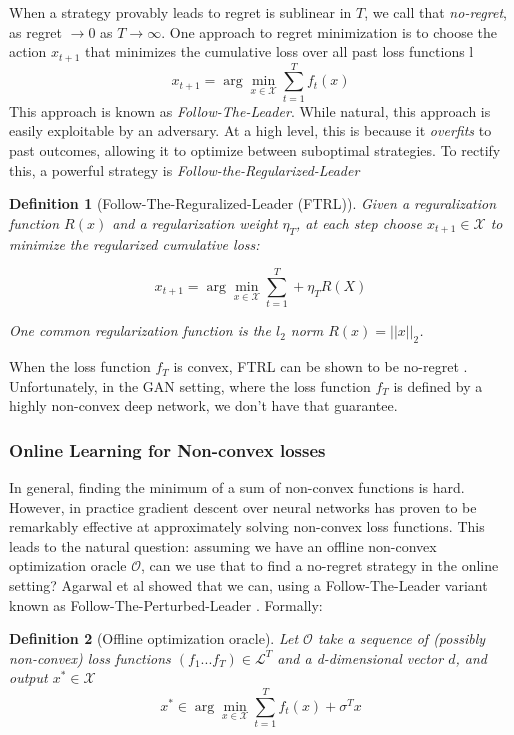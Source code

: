 \documentclass[]{article}
\newcommand{\X}{\mathcal{X}}
\newtheorem{definition}{Definition}[section]
\theoremstyle{definition}
\begin{document}
When a strategy provably leads to regret is sublinear in $T$, we call that \emph{no-regret}, as regret $\to 0$ as $T \to \infty$. One approach to regret minimization is to choose the action $x_{t+1}$ that minimizes the cumulative loss over all past loss functions l
\begin{equation}
    x_{t+1} = \arg\min_{x \in \X} \sum_{t=1}^T f_t(x)
\end{equation}
This approach is known as \emph{Follow-The-Leader}. While natural, this approach is easily exploitable by an adversary. At a high level, this is because it \emph{overfits} to past outcomes, allowing it to optimize between suboptimal strategies. To rectify this, a powerful strategy is \emph{Follow-the-Regularized-Leader}

\begin{definition}[Follow-The-Reguralized-Leader (FTRL)]
    Given a reguralization function $R(x)$ and a regularization weight $\eta_T$, at each step choose $x_{t+1} \in \X$ to minimize the regularized cumulative loss:

    \begin{equation}
        x_{t+1} = \arg\min_{x \in \X} \sum_{t=1}^T + \eta_T R(X)
    \end{equation}

    One common regularization function is the $l_2$ norm $R(x) = ||x||_2$.  
\end{definition}

When the loss function $f_T$ is convex, FTRL can be shown to be no-regret \cite{Haz19}. Unfortunately, in the GAN setting, where the loss function $f_T$ is defined by a highly non-convex deep network, we don't have that guarantee. 

\subsubsection{Online Learning for Non-convex losses}
In general, finding the minimum of a sum of non-convex functions is hard. However, in practice gradient descent over neural networks has proven to be remarkably effective at approximately solving non-convex loss functions. This leads to the natural question: assuming we have an offline non-convex optimization oracle $\mathcal{O}$, can we use that to find a no-regret strategy in the online setting? Agarwal et al showed that we can, using a Follow-The-Leader variant known as Follow-The-Perturbed-Leader \cite{AGH18}. Formally:

\begin{definition}[Offline optimization oracle]
    Let $\mathcal{O}$ take a sequence of (possibly non-convex) loss functions $(f_1...f_T) \in \mathcal{L}^T$ and a d-dimensional vector $d$, and output $x^* \in \X$
    \begin{equation}
        x^* \in \arg\min_{x \in \X} \sum_{t=1}^Tf_t(x) + \sigma^Tx
    \end{equation}
\end{definition}
\end{document}
